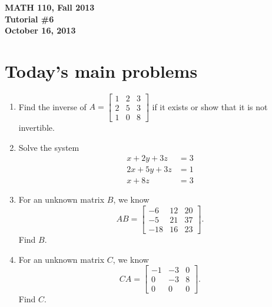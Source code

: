 \documentclass[11pt]{exam}
\newcommand{\mat}[1]{\begin{bmatrix}#1\end{bmatrix}}
\newcommand{\mthCourse}{MATH 110}
\newcommand{\mthTerm}{Fall 2013}
\newcommand{\mthTutorialNumber}{6}
\newcommand{\mthDate}{October 16, 2013}
\begin{document}
{\large
	\begin{center}
		{\bf \mthCourse, \mthTerm}\\ 
		{\bf Tutorial \#\mthTutorialNumber}\\
		{\bf \mthDate}
	\end{center}
}

\section*{Today's main problems}

\begin{enumerate}
	\item Find the inverse of $A=\mat{1&2&3\\2&5&3\\1&0&8}$ if it exists
		or show that it is not invertible.
	\item Solve the system
		\[
			\begin{array}{rl}
				x+2y+3z &=3\\
				2x+5y+3z &=1\\
				x+8z &= 3
			\end{array}
		\]
	\item For an unknown matrix $B$, we know 
		\[
			AB=\mat{-6&12&20\\-5&21&37\\-18&16&23}.
		\]
		Find $B$.
	\item For an unknown matrix $C$, we know
		\[
			CA = \mat{-1 &-3& 0\\0&-3&8\\0&0&0}.
		\]
		Find $C$.

\end{enumerate}
\end{document}
